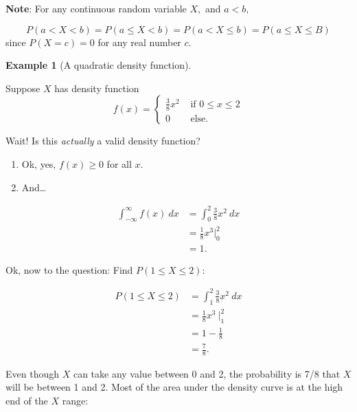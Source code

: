 \documentclass[
]{book}
\providecommand{\tightlist}{%
  \setlength{\itemsep}{0pt}\setlength{\parskip}{0pt}}
\theoremstyle{definition}
\theoremstyle{definition}
\newtheorem{example}{Example}[chapter]
\theoremstyle{definition}
\theoremstyle{definition}
\theoremstyle{remark}
\begin{document}
\textbf{Note}: For any continuous random variable \(X,\) and \(a < b,\)

\[P(a < X < b) = P(a \leq X < b) = P(a < X \leq b) = P(a \leq X \leq B)\] since \(P(X = c) = 0\) for any real number \(c\).

\begin{example}[A quadratic density function]
\protect\hypertarget{exm:cont-quad-rv}{}\label{exm:cont-quad-rv}

Suppose \(X\) has density function
\[
f(x)=
\begin{cases}
\frac{3}{8}x^2 &\text{ if }0 \leq x \leq 2 \\
0 &\text{ else.}
\end{cases}
\]

Wait! Is this \emph{actually} a valid density function?

\begin{enumerate}
\def\labelenumi{\arabic{enumi}.}
\tightlist
\item
  Ok, yes, \(f(x) \geq 0\) for all \(x\).
\item
  And\ldots{}
\end{enumerate}

\begin{align*}
\int_{-\infty}^{\infty} f(x) ~dx &= \int_0^2 \frac{3}{8} x^2~dx \\
                            &= \frac{1}{8} x^3 \Big|_0^2 \\
                            &= 1.
\end{align*}

Ok, now to the question: Find \(P(1 \leq X \leq 2)\):

\begin{align*}
 P(1 \leq X \leq 2)   &= \int_1^2 \frac{3}{8} x^2~dx \\
                      &= \frac{1}{8} x^3 ~\biggr|_1^2 \\
                      &= 1 - \frac{1}{8} \\
                      &= \frac{7}{8}.
\end{align*}

Even though \(X\) can take any value between 0 and 2, the probability is 7/8 that \(X\) will be between 1 and 2. Most of the area under the density curve is at the high end of the \(X\) range:


\end{example}
\end{document}
